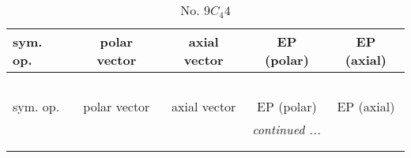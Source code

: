 \documentclass[fleqn,10pt,landscape]{jsarticle}
\begin{document}
\begin{center}
\renewcommand{\arraystretch}{1.3}
\begin{longtable}{lcccc}
\caption{No. 9\quad$C_{4}$\quad$4$\quad[ tetragonal ]}
 \\
 \hline \hline
sym. op. & polar vector & axial vector & EP (polar) & EP (axial) \\ \hline \endfirsthead

\multicolumn{4}{l}{\tablename\ \thetable{}} \\
 \hline \hline
sym. op. & polar vector & axial vector & EP (polar) & EP (axial) \\ \hline \endhead

 \hline \hline
\multicolumn{4}{r}{\footnotesize\it continued ...} \\ \endfoot

 \hline \hline
\multicolumn{4}{r}{} \\ \endlastfoot


\end{longtable}
\end{center}
\end{document}
